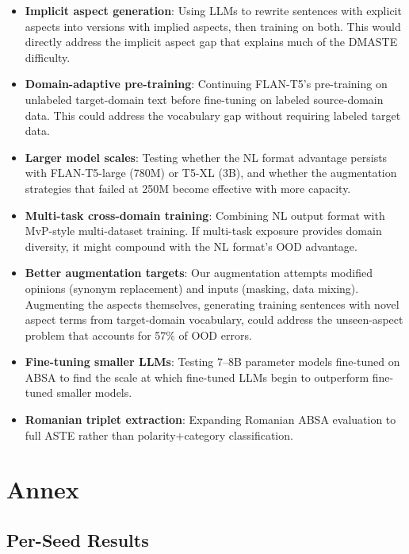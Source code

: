 \documentclass[12pt,a4paper]{report}
\begin{document}
\begin{itemize}
    \item \textbf{Implicit aspect generation}: Using LLMs to rewrite sentences with explicit aspects into versions with implied aspects, then training on both. This would directly address the implicit aspect gap that explains much of the DMASTE difficulty.
    
    \item \textbf{Domain-adaptive pre-training}: Continuing FLAN-T5's pre-training on unlabeled target-domain text before fine-tuning on labeled source-domain data. This could address the vocabulary gap without requiring labeled target data.
    
    \item \textbf{Larger model scales}: Testing whether the NL format advantage persists with FLAN-T5-large (780M) or T5-XL (3B), and whether the augmentation strategies that failed at 250M become effective with more capacity.
    
    \item \textbf{Multi-task cross-domain training}: Combining NL output format with MvP-style multi-dataset training. If multi-task exposure provides domain diversity, it might compound with the NL format's OOD advantage.
    
    \item \textbf{Better augmentation targets}: Our augmentation attempts modified opinions (synonym replacement) and inputs (masking, data mixing). Augmenting the aspects themselves, generating training sentences with novel aspect terms from target-domain vocabulary, could address the unseen-aspect problem that accounts for 57\% of OOD errors.
    
    \item \textbf{Fine-tuning smaller LLMs}: Testing 7--8B parameter models fine-tuned on ABSA to find the scale at which fine-tuned LLMs begin to outperform fine-tuned smaller models.
    
    \item \textbf{Romanian triplet extraction}: Expanding Romanian ABSA evaluation to full ASTE rather than polarity+category classification.
\end{itemize}


\chapter{Annex}\label{ch:annex}

\section{Per-Seed Results}
\end{document}
